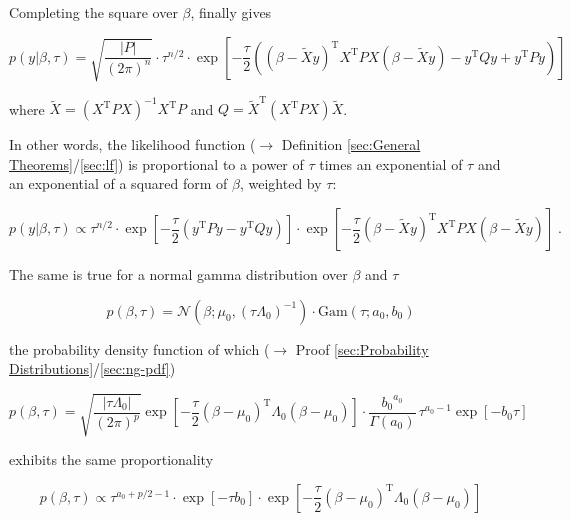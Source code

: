 \documentclass[a4paper,12pt,twoside]{book}
\begin{document}
Completing the square over $\beta$, finally gives

\begin{equation} \label{eq:blr-prior-GLM-LF-s3}
p(y|\beta,\tau) = \sqrt{\frac{|P|}{(2 \pi)^n}} \cdot \tau^{n/2} \cdot \exp\left[ -\frac{\tau}{2} \left( (\beta - \tilde{X}y)^\mathrm{T} X^\mathrm{T} P X (\beta - \tilde{X}y) - y^\mathrm{T} Q y + y^\mathrm{T} P y \right) \right]
\end{equation}

where $\tilde{X} = \left( X^\mathrm{T} P X \right)^{-1} X^\mathrm{T} P$ and $Q = \tilde{X}^\mathrm{T} \left( X^\mathrm{T} P X \right) \tilde{X}$.

\vspace{1em}
In other words, the likelihood function ($\rightarrow$ Definition \ref{sec:General Theorems}/\ref{sec:lf}) is proportional to a power of $\tau$ times an exponential of $\tau$ and an exponential of a squared form of $\beta$, weighted by $\tau$:

\begin{equation} \label{eq:blr-prior-GLM-LF-s4}
p(y|\beta,\tau) \propto \tau^{n/2} \cdot \exp\left[ -\frac{\tau}{2} \left( y^\mathrm{T} P y - y^\mathrm{T} Q y \right) \right] \cdot \exp\left[ -\frac{\tau}{2} (\beta - \tilde{X}y)^\mathrm{T} X^\mathrm{T} P X (\beta - \tilde{X}y) \right] \; .
\end{equation}

The same is true for a normal gamma distribution over $\beta$ and $\tau$

\begin{equation} \label{eq:blr-prior-BLR-prior-s1}
p(\beta,\tau) = \mathcal{N}(\beta; \mu_0, (\tau \Lambda_0)^{-1}) \cdot \mathrm{Gam}(\tau; a_0, b_0)
\end{equation}

the probability density function of which ($\rightarrow$ Proof \ref{sec:Probability Distributions}/\ref{sec:ng-pdf})

\begin{equation} \label{eq:blr-prior-BLR-prior-s2}
p(\beta,\tau) = \sqrt{\frac{|\tau \Lambda_0|}{(2 \pi)^p}} \exp\left[ -\frac{\tau}{2} (\beta-\mu_0)^\mathrm{T} \Lambda_0 (\beta-\mu_0) \right] \cdot \frac{ {b_0}^{a_0}}{\Gamma(a_0)} \, \tau^{a_0-1} \exp[-b_0 \tau]
\end{equation}

exhibits the same proportionality

\begin{equation} \label{eq:blr-prior-BLR-prior-s3}
p(\beta,\tau) \propto \tau^{a_0+p/2-1} \cdot \exp[-\tau b_0] \cdot \exp\left[ -\frac{\tau}{2} (\beta-\mu_0)^\mathrm{T} \Lambda_0 (\beta-\mu_0) \right]
\end{equation}
\end{document}
